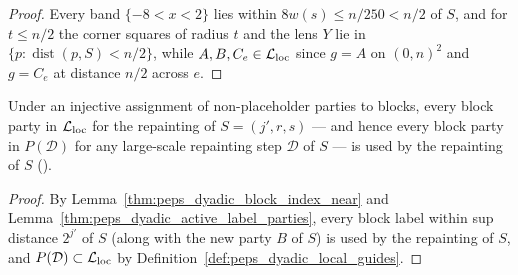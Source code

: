 \begin{proof}\leanok
    Every band $\{-8<x<2\}$ lies within $8w(s)\le n/250<n/2$ of $S$, and for
    $t\le n/2$ the corner squares of radius $t$ and the lens $Y$ lie in
    $\{p:\operatorname{dist}(p,S)<n/2\}$, while $A,B,C_e\in\mathcal L_{\rm loc}$
    since $g=A$ on $(0,n)^2$ and $g=C_e$ at distance $n/2$ across $e$.
\end{proof}

\begin{lemma}
    \label{thm:peps_dyadic_large_repainting_parties}
    \leanok
    Under an injective assignment of non-placeholder parties to blocks, every block
    party in $\mathcal L_{\rm loc}$ for the repainting of $S=(j',r,s)$ — and hence
    every block party in $P(\mathcal D)$ for any large-scale repainting step
    $\mathcal D$ of $S$ — is used by the repainting of $S$
    (\cite[Section~7, lines 585--596]{OpenAI2026PolynomialPEPS}).
\end{lemma}

\begin{proof}\leanok
    By Lemma~\ref{thm:peps_dyadic_block_index_near} and
    Lemma~\ref{thm:peps_dyadic_active_label_parties}, every block label within
    sup distance $2^{j'}$ of $S$ (along with the new party $B$ of $S$) is used by
    the repainting of $S$, and $P(\mathcal D)\subset\mathcal L_{\rm loc}$ by
    Definition~\ref{def:peps_dyadic_local_guides}.
\end{proof}

